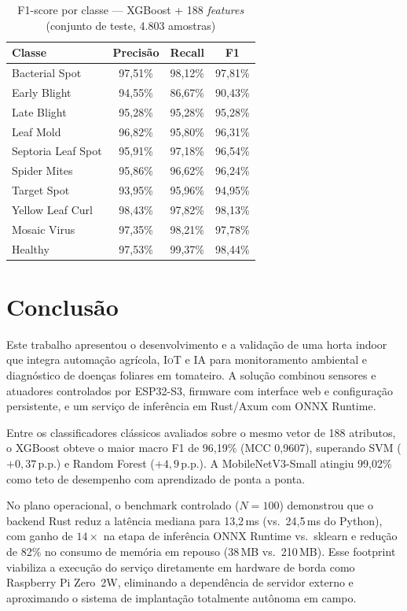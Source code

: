 \documentclass[12pt]{article}
\providecommand{\gls}[1]{\textnormal{\textsc{#1}}}
\begin{document}
\begin{table}[ht]
\caption{F1-score por classe --- XGBoost + 188 \textit{features} (conjunto de
teste, 4.803 amostras)}
\label{tb:perclass}
\centering
\setlength{\tabcolsep}{5pt}
\renewcommand{\arraystretch}{1.1}
\begin{tabularx}{\textwidth}{Y c c c}
\toprule
\textbf{Classe} & \textbf{Precisão} & \textbf{Recall} & \textbf{F1} \\
\midrule
Bacterial Spot      & 97,51\% & 98,12\% & 97,81\% \\
Early Blight        & 94,55\% & 86,67\% & 90,43\% \\
Late Blight         & 95,28\% & 95,28\% & 95,28\% \\
Leaf Mold           & 96,82\% & 95,80\% & 96,31\% \\
Septoria Leaf Spot  & 95,91\% & 97,18\% & 96,54\% \\
Spider Mites        & 95,86\% & 96,62\% & 96,24\% \\
Target Spot         & 93,95\% & 95,96\% & 94,95\% \\
Yellow Leaf Curl    & 98,43\% & 97,82\% & 98,13\% \\
Mosaic Virus        & 97,35\% & 98,21\% & 97,78\% \\
Healthy             & 97,53\% & 99,37\% & 98,44\% \\
\bottomrule
\end{tabularx}
\end{table}

\section{Conclusão}

Este trabalho apresentou o desenvolvimento e a validação de uma horta indoor
que integra automação agrícola, \gls{IoT} e \gls{IA} para monitoramento
ambiental e diagnóstico de doenças foliares em tomateiro. A solução combinou
sensores e atuadores controlados por \gls{ESP32}-S3, firmware com interface
web e configuração persistente, e um serviço de inferência em Rust/Axum com
ONNX Runtime.

Entre os classificadores clássicos avaliados sobre o mesmo vetor de 188
atributos, o XGBoost obteve o maior macro F1 de 96,19\% (MCC 0,9607),
superando SVM ($+0{,}37$\,p.p.) e Random Forest ($+4{,}9$\,p.p.). A
MobileNetV3-Small atingiu 99,02\% como teto de desempenho com aprendizado de
ponta a ponta.

No plano operacional, o benchmark controlado ($N = 100$) demonstrou que o
backend Rust reduz a latência mediana para 13,2\,ms (vs.\ 24,5\,ms do
Python), com ganho de $14\times$ na etapa de inferência ONNX Runtime vs.\
sklearn e redução de 82\% no consumo de memória em repouso (38\,MB vs.\
210\,MB). Esse footprint viabiliza a execução do serviço diretamente em
hardware de borda como Raspberry Pi Zero~2W, eliminando a dependência de
servidor externo e aproximando o sistema de implantação totalmente autônoma em
campo.
\end{document}
